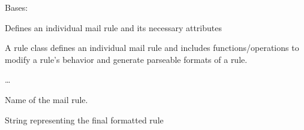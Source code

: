 \documentclass[letterpaper,10pt,english]{sphinxmanual}
\begin{document}
\begin{fulllineitems}
\label{\detokenize{_autosummary/gmail_rules.rules.rule:gmail_rules.rules.rule.Rule}}
\pysigstartsignatures
{}
\pysigstopsignatures
\sphinxAtStartPar
Bases: 

\sphinxAtStartPar
Defines an individual mail rule and its necessary attributes

\sphinxAtStartPar
A rule class defines an individual mail rule and includes functions/operations
to modify a rule’s behavior and generate parseable formats of a rule.

\sphinxAtStartPar
…

\begin{fulllineitems}
\label{\detokenize{_autosummary/gmail_rules.rules.rule:gmail_rules.rules.rule.Rule.name}}
\pysigstartsignatures
{}
\pysigstopsignatures
\sphinxAtStartPar
Name of the mail rule.
\begin{quote}\begin{description}
\sphinxAtStartPar
{}

\end{description}\end{quote}

\end{fulllineitems}


\begin{fulllineitems}
\label{\detokenize{_autosummary/gmail_rules.rules.rule:gmail_rules.rules.rule.Rule.final_rule}}
\pysigstartsignatures
{}
\pysigstopsignatures
\sphinxAtStartPar
String representing the final formatted rule
\begin{quote}\begin{description}
\sphinxAtStartPar
{}


\end{description}
\end{quote}
\end{fulllineitems}
\end{fulllineitems}
\end{document}

